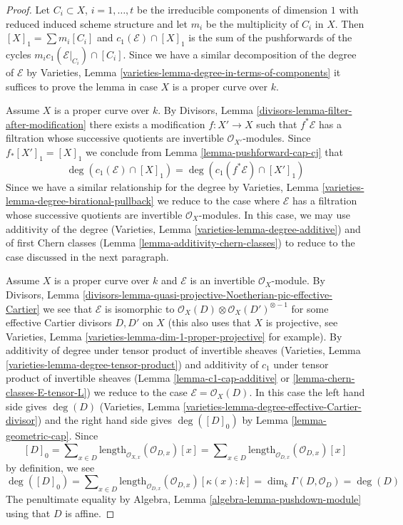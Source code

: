 \documentclass[10pt,a4paper]{amsart}
\theoremstyle{plain}
\theoremstyle{definition}
\theoremstyle{remark}
\numberwithin{equation}{subsection}
\begin{document}
\begin{proof}
Let $C_i \subset X$, $i = 1, \ldots, t$ be the irreducible components
of dimension $1$ with reduced induced scheme structure and let $m_i$ be the
multiplicity of $C_i$ in $X$. Then $[X]_1 = \sum m_i[C_i]$ and
$c_1(\mathcal{E}) \cap [X]_1$ is the sum of the pushforwards of the cycles
$m_i c_1(\mathcal{E}|_{C_i}) \cap [C_i]$. Since we have a similar decomposition
of the degree of $\mathcal{E}$ by
Varieties, Lemma \ref{varieties-lemma-degree-in-terms-of-components}
it suffices to prove the lemma in case $X$ is a proper curve over $k$.

\medskip\noindent
Assume $X$ is a proper curve over $k$.
By Divisors, Lemma \ref{divisors-lemma-filter-after-modification}
there exists a modification $f : X' \to X$ such that $f^*\mathcal{E}$
has a filtration whose successive quotients are invertible
$\mathcal{O}_{X'}$-modules. Since $f_*[X']_1 = [X]_1$ we conclude
from Lemma \ref{lemma-pushforward-cap-cj} that
$$
\deg(c_1(\mathcal{E}) \cap [X]_1) = \deg(c_1(f^*\mathcal{E}) \cap [X']_1)
$$
Since we have a similar relationship for the degree by
Varieties, Lemma \ref{varieties-lemma-degree-birational-pullback}
we reduce to the case where $\mathcal{E}$ has a filtration whose
successive quotients are invertible $\mathcal{O}_X$-modules.
In this case, we may use additivity of the degree
(Varieties, Lemma \ref{varieties-lemma-degree-additive})
and of first Chern classes (Lemma \ref{lemma-additivity-chern-classes})
to reduce to the case discussed in the next paragraph.

\medskip\noindent
Assume $X$ is a proper curve over $k$ and $\mathcal{E}$ is an
invertible $\mathcal{O}_X$-module. By
Divisors, Lemma
\ref{divisors-lemma-quasi-projective-Noetherian-pic-effective-Cartier}
we see that $\mathcal{E}$ is isomorphic to
$\mathcal{O}_X(D) \otimes \mathcal{O}_X(D')^{\otimes -1}$
for some effective Cartier divisors $D, D'$ on $X$ (this also uses
that $X$ is projective, see
Varieties, Lemma \ref{varieties-lemma-dim-1-proper-projective} for example).
By additivity of degree under tensor product of invertible sheaves
(Varieties, Lemma \ref{varieties-lemma-degree-tensor-product})
and additivity of $c_1$ under tensor product of invertible sheaves
(Lemma \ref{lemma-c1-cap-additive} or \ref{lemma-chern-classes-E-tensor-L})
we reduce to the case $\mathcal{E} = \mathcal{O}_X(D)$.
In this case the left hand side gives $\deg(D)$
(Varieties, Lemma \ref{varieties-lemma-degree-effective-Cartier-divisor})
and the right hand side gives $\deg([D]_0)$ by
Lemma \ref{lemma-geometric-cap}.
Since
$$
[D]_0 = \sum\nolimits_{x \in D}
\text{length}_{\mathcal{O}_{X, x}}(\mathcal{O}_{D, x}) [x] =
\sum\nolimits_{x \in D}
\text{length}_{\mathcal{O}_{D, x}}(\mathcal{O}_{D, x}) [x]
$$
by definition, we see
$$
\deg([D]_0) = \sum\nolimits_{x \in D}
\text{length}_{\mathcal{O}_{D, x}}(\mathcal{O}_{D, x}) [\kappa(x) : k] =
\dim_k \Gamma(D, \mathcal{O}_D) = \deg(D)
$$
The penultimate equality by
Algebra, Lemma \ref{algebra-lemma-pushdown-module}
using that $D$ is affine.
\end{proof}
\end{document}
